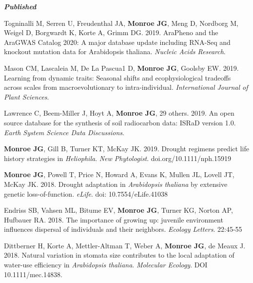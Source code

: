 \documentclass[12pt,english]{article}
\begin{document}
\begin{hangparas}{.5in}{1}

\textbf{\textit{Published}}\par

\hspace{1em} Togninalli M, Serren U, Freudenthal JA,  \textbf{Monroe JG}, Meng D, Nordborg M, Weigel D, Borgwardt K, Korte A, Grimm DG. 2019. AraPheno and the AraGWAS Catalog 2020: A major database update including RNA-Seq and knockout mutation data for Arabidopsis thaliana. \textit{Nucleic Acids Research}. 
\vspace{1ex}\par
\hspace{1em} Mason CM, Lascaleia M, De La Pascua1 D, \textbf{Monroe JG},  Goolsby EW. 2019. Learning from dynamic traits: Seasonal shifts and ecophysiological tradeoffs across scales from macroevolutionary to intra-individual. \textit{International Journal of Plant Sciences}. 
\vspace{1ex}\par
\hspace{1em} Lawrence C, Beem-Miller J, Hoyt A, \textbf{Monroe JG},  29 others. 2019. An open source database for the synthesis of soil radiocarbon data: ISRaD version 1.0. \textit{Earth System Science Data Discussions}.
\vspace{1ex}\par
\hspace{1em} \textbf{Monroe JG}, Gill B, Turner KT, McKay JK. 2019. Drought regimens predict life history strategies in \textit{Heliophila}. \textit{New Phytologist}. doi.org/10.1111/nph.15919
\vspace{1ex}\par
\hspace{1em} \textbf{Monroe JG}, Powell T, Price N, Howard A, Evans K, Mullen JL, Lovell JT, McKay JK. 2018. Drought adaptation in \textit{Arabidopsis thaliana} by extensive genetic loss-of-function. \textit{eLife}. doi: 10.7554/eLife.41038
\vspace{1ex}\par
\hspace{1em} Endriss SB, Vahsen ML, Bitume EV, \textbf{Monroe JG}, Turner KG, Norton AP, Hufbauer RA. 2018. The importance of growing up: juvenile environment influences dispersal of individuals and their neighbors. \textit{Ecology Letters}. 22:45-55
\vspace{1ex}\par
\hspace{1em} Dittberner H, Korte A, Mettler-Altman T, Weber A, \textbf{Monroe JG}, de Meaux J. 2018. Natural variation in stomata size contributes to the local adaptation of water-use efficiency in \textit{Arabidopsis thaliana}. \textit{Molecular Ecology}. DOI 10.1111/mec.14838.

\end{hangparas}
\end{document}

